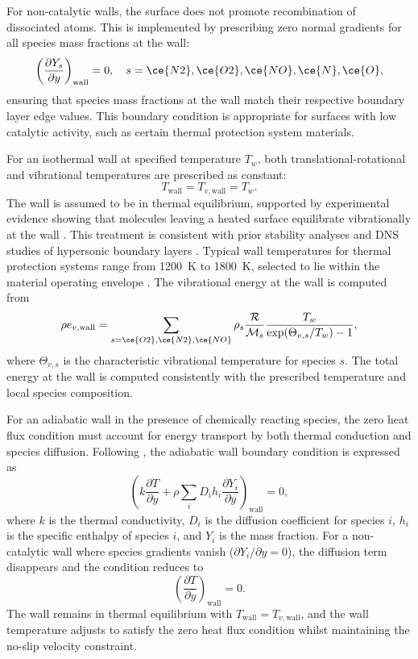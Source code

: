 For non-catalytic walls, the surface does not promote recombination of dissociated atoms. This is implemented by prescribing zero normal gradients for all species mass fractions at the wall:
\begin{equation}
\left( \frac{\partial Y_s}{\partial y} \right)_{\text{wall}} = 0, \quad s = \ce{N2}, \ce{O2}, \ce{NO}, \ce{N}, \ce{O},
\end{equation}
ensuring that species mass fractions at the wall match their respective boundary layer edge values. This boundary condition is appropriate for surfaces with low catalytic activity, such as certain thermal protection system materials.

For an isothermal wall at specified temperature $T_w$, both translational-rotational and vibrational temperatures are prescribed as constant:
\begin{equation}
T_{\text{wall}} = T_{v,\text{wall}} = T_w.
\end{equation}
The wall is assumed to be in thermal equilibrium, supported by experimental evidence showing that molecules leaving a heated surface equilibrate vibrationally at the wall \citep{Park1990,CandlerNompelis2021}. This treatment is consistent with prior stability analyses \citep{Hudson1997,Bitter2015} and DNS studies of hypersonic boundary layers \citep{PassiatoreEtAl2022,DiRenzo2021}. Typical wall temperatures for thermal protection systems range from 1200~K to 1800~K, selected to lie within the material operating envelope \citep{CedillosBarraza2016}. The vibrational energy at the wall is computed from
\begin{equation}\label{equation:evs}
\rho e_{v,\text{wall}} = \sum_{s=\ce{O2}, \ce{N2}, \ce{NO}} \rho_s \frac{\mathcal{R}}{\mathcal{M}_s} \frac{T_w}{\exp(\Theta_{v,s}/T_w) - 1},
\end{equation}
where $\Theta_{v,s}$ is the characteristic vibrational temperature for species $s$. The total energy at the wall is computed consistently with the prescribed temperature and local species composition.

For an adiabatic wall in the presence of chemically reacting species, the zero heat flux condition must account for energy transport by both thermal conduction and species diffusion. Following \citet{Anderson2019}, the adiabatic wall boundary condition is expressed as
\begin{equation}
\left( k \frac{\partial T}{\partial y} + \rho \sum_i D_i h_i \frac{\partial Y_i}{\partial y} \right)_{\text{wall}} = 0,
\end{equation}
where $k$ is the thermal conductivity, $D_i$ is the diffusion coefficient for species $i$, $h_i$ is the specific enthalpy of species $i$, and $Y_i$ is the mass fraction. For a non-catalytic wall where species gradients vanish ($\partial Y_i/\partial y = 0$), the diffusion term disappears and the condition reduces to
\begin{equation}
\left( \frac{\partial T}{\partial y} \right)_{\text{wall}} = 0.
\end{equation}
The wall remains in thermal equilibrium with $T_{\text{wall}} = T_{v,\text{wall}}$, and the wall temperature adjusts to satisfy the zero heat flux condition whilst maintaining the no-slip velocity constraint.

